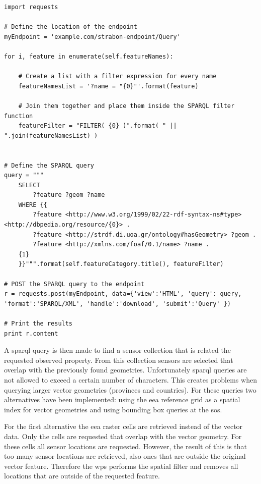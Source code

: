 \begin{lstlisting}[float,caption={Example script that sends a SPARQL query for retreiving geometries of input features}, label={lst:getGeometries}]
import requests 

# Define the location of the endpoint
myEndpoint = 'example.com/strabon-endpoint/Query'

for i, feature in enumerate(self.featureNames):
	
	# Create a list with a filter expression for every name 
	featureNamesList = '?name = "{0}"'.format(feature)
	
	# Join them together and place them inside the SPARQL filter function
	featureFilter = "FILTER( {0} )".format( " || ".join(featureNamesList) )


# Define the SPARQL query
query = """
	SELECT 
		?feature ?geom ?name
	WHERE {{ 
		?feature <http://www.w3.org/1999/02/22-rdf-syntax-ns#type> <http://dbpedia.org/resource/{0}> . 
		?feature <http://strdf.di.uoa.gr/ontology#hasGeometry> ?geom . 
		?feature <http://xmlns.com/foaf/0.1/name> ?name . 
	{1}
	}}""".format(self.featureCategory.title(), featureFilter)

# POST the SPARQL query to the endpoint
r = requests.post(myEndpoint, data={'view':'HTML', 'query': query, 'format':'SPARQL/XML', 'handle':'download', 'submit':'Query' }) 

# Print the results
print r.content
\end{lstlisting}

A \ac{sparql} query is then made to find a sensor collection that is related the requested observed property. From this collection sensors are selected that overlap with the previously found geometries. Unfortunately \ac{sparql} queries are not allowed to exceed a certain number of characters. This creates problems when querying larger vector geometries (provinces and countries). For these queries two alternatives have been implemented: using the \ac{eea} reference grid as a spatial index for vector geometries and using bounding box queries at the \ac{sos}. 

For the first alternative the \ac{eea} raster cells are retrieved instead of the vector data. Only the cells are requested that overlap with the vector geometry. For these cells all sensor locations are requested. However, the result of this is that too many sensor locations are retrieved, also ones that are outside the original vector feature. Therefore the \ac{wps} performs the spatial filter and removes all locations that are outside of the requested feature. 

